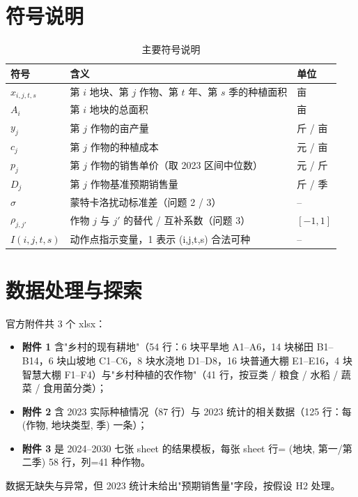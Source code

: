 \documentclass[UTF8,a4paper,12pt]{ctexart}
\begin{document}
\section{符号说明}
\begin{table}[H]
  \centering
  \caption{主要符号说明}
  \label{tab:notation}
  \begin{tabular}{lll}
    \toprule
    符号 & 含义 & 单位 \\
    \midrule
    $x_{i,j,t,s}$ & 第 $i$ 地块、第 $j$ 作物、第 $t$ 年、第 $s$ 季的种植面积 & 亩 \\
    $A_i$ & 第 $i$ 地块的总面积 & 亩 \\
    $y_j$ & 第 $j$ 作物的亩产量 & 斤 / 亩 \\
    $c_j$ & 第 $j$ 作物的种植成本 & 元 / 亩 \\
    $p_j$ & 第 $j$ 作物的销售单价（取 2023 区间中位数） & 元 / 斤 \\
    $D_j$ & 第 $j$ 作物基准预期销售量 & 斤 / 季 \\
    $\sigma$ & 蒙特卡洛扰动标准差（问题 2 / 3） & -- \\
    $\rho_{j,j'}$ & 作物 $j$ 与 $j'$ 的替代 / 互补系数（问题 3） & $[-1,1]$ \\
    $I(i,j,t,s)$ & 动作点指示变量，1 表示 (i,j,t,s) 合法可种 & -- \\
    \bottomrule
  \end{tabular}
\end{table}

\section{数据处理与探索}
官方附件共 3 个 xlsx：
\begin{itemize}
  \item \textbf{附件 1} 含"乡村的现有耕地"（54 行：6 块平旱地 A1--A6，14 块梯田 B1--B14，6 块山坡地 C1--C6，8 块水浇地 D1--D8，16 块普通大棚 E1--E16，4 块智慧大棚 F1--F4）与"乡村种植的农作物"（41 行，按豆类 / 粮食 / 水稻 / 蔬菜 / 食用菌分类）；
  \item \textbf{附件 2} 含 2023 实际种植情况（87 行）与 2023 统计的相关数据（125 行：每 (作物, 地块类型, 季) 一条）；
  \item \textbf{附件 3} 是 2024--2030 七张 sheet 的结果模板，每张 sheet 行= (地块, 第一/第二季) 58 行，列=41 种作物。
\end{itemize}
数据无缺失与异常，但 2023 统计未给出"预期销售量"字段，按假设 H2 处理。
\end{document}
